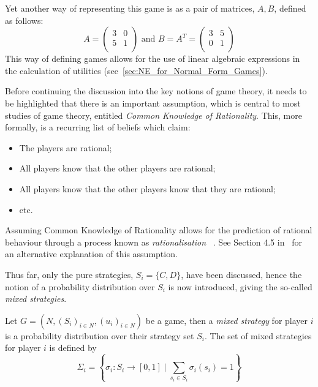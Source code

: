 Yet another way of representing this game is as a pair of matrices, \(A, B\),
defined as follows:
\begin{equation}
    A = 
    \begin{pmatrix}
       3 & 0\\
       5 & 1\\ 
    \end{pmatrix}
    \text{ and } B = A^{T} =
    \begin{pmatrix}
        3 & 5\\
        0 & 1\\
    \end{pmatrix}
\end{equation}
This way of defining games allows for the use of linear algebraic expressions in
the calculation of utilities (see~\autoref{sec:NE_for_Normal_Form_Games}).

Before continuing the discussion into the key notions of game theory, it needs
to be highlighted that there is an important assumption, which is central to
most studies of game theory, entitled \textit{Common Knowledge of Rationality}.
This, more formally, is a recurring list of beliefs which claim:
    \begin{itemize}
        \item The players are rational;
        \item All players know that the other players are rational;
        \item All players know that the other players know that they are 
        rational; 
        \item etc.    
    \end{itemize}
Assuming Common Knowledge of Rationality allows for the prediction of rational
behaviour through a process known as \textit{rationalisation}
~\cite{Knight2019}. See Section 4.5 in~\cite{maschler_solan_zamir_2013} for an
alternative explanation of this assumption. 

Thus far, only the pure strategies, \(S_{i}=\{C, D\} \), have
been discussed, hence the notion of a probability distribution over \(S_{i}\) is
now introduced, giving the so-called \textit{mixed strategies}.

\begin{definition}
   Let \(G=(N, {(S_{i})}_{i \in N}, {(u_{i})}_{i \in N})\) be a game, then a \textit{mixed strategy} for player \(i\) is a
probability distribution over their strategy set \(S_{i}\). The set of mixed
strategies for player \(i\) is defined by 
\begin{equation}
    \Sigma_{i} = \left \{ \sigma_{i} : S_{i} \to [0, 1] \mid \sum_{s_{i} \in S_{i}}{\sigma_
{i}(s_{i})} = 1 \right \} 
\end{equation}
\end{definition}

